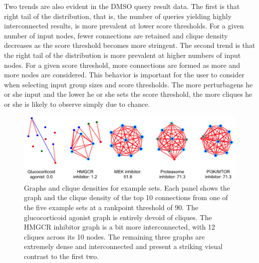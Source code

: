 \documentclass[12pt]{article}
\begin{document}
Two trends are also evident in the DMSO query result data. The first is that right tail of the distribution, that is, the number of queries yielding highly interconnected results, is more prevalent at lower score thresholds. For a given number of input nodes, fewer connections are retained and clique density decreases as the score threshold becomes more stringent. The second trend is that the right tail of the distribution is more prevalent at higher numbers of input nodes. For a given score threshold, more connections are formed as more and more nodes are considered. This behavior is important for the user to consider when selecting input group sizes and score thresholds. The more perturbagens he or she input and the lower he or she sets the score threshold, the more cliques he or she is likely to observe simply due to chance.  

\begin{figure}[h]
\centering
\includegraphics[scale=0.5]{img/example_set_densities.png}
\caption{Graphs and clique densities for example sets. Each panel shows the graph and the clique density of the top 10 connections from one of the five example sets at a rankpoint threshold of 90. The glucocorticoid agonist graph is entirely devoid of cliques. The HMGCR inhibitor graph is a bit more interconnected, with 12 cliques across its 10 nodes. The remaining three graphs are extremely dense and interconnected and present a striking visual contrast to the first two.}
\label{fig:example_set_densities}
\end{figure}
\end{document}
